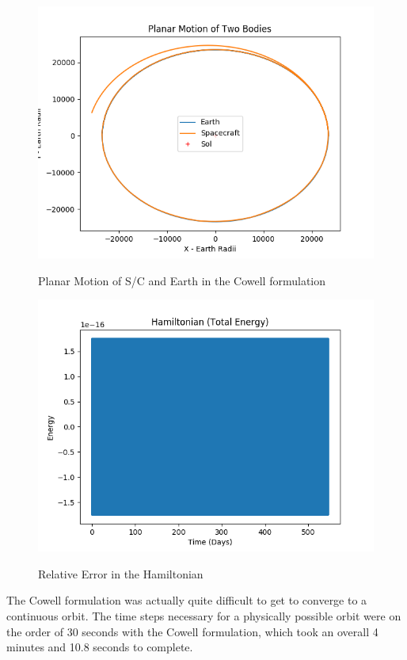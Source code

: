 \documentclass[11pt,twoside,letterpaper]{article}
\begin{document}
  \begin{figure}
    \caption{Planar Motion of S/C and Earth in the Cowell formulation}
    \centering
    \includegraphics[scale=0.5]{PlanarPath90}
    \label{cowPath}
  \end{figure}

  \begin{figure}
    \caption{Relative Error in the Hamiltonian}
    \centering
    \includegraphics[scale=0.5]{Hamiltonian90}
    \label{cowHam}
  \end{figure}  

  The Cowell formulation was actually quite difficult to get to
  converge to a continuous orbit. The time steps necessary for a
  physically possible orbit were on the order of 30 seconds with the
  Cowell formulation, which took an overall 4 minutes and 10.8 seconds
  to complete.
\end{document}

